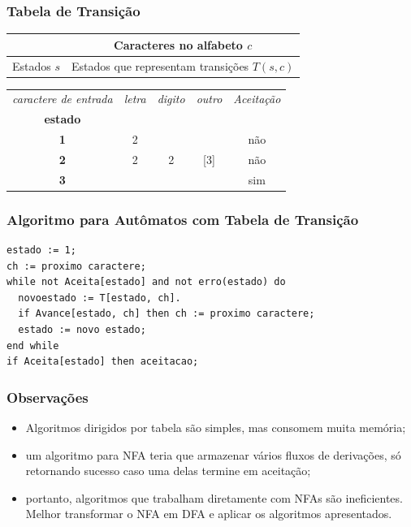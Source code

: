 \documentclass[table]{beamer}
\begin{document}
\begin{frame}
   \frametitle{Tabela de Transição}
   \centering
   \begin{table}
      \begin{tabular}{c|c}
       & Caracteres no alfabeto $c$ \\
      \hline 
      Estados $s$ & Estados que representam transições $T(s,c)$ \\
   \end{tabular}
   \end{table}

   \begin{table}
      \begin{tabular}{|c|c|c|c|c|}
      \hline
      \textit{caractere de entrada} & \textit{letra} & \textit{digito} & \textit{outro} & \textit{Aceitação} \\
      \textbf{estado} & & & &\\
      \hline
      \textbf{1} & 2 & & & não \\
      \textbf{2} & 2 & 2 & [3] & não \\
      \textbf{3} &   &   & & sim  \\
      \hline
      \end{tabular}
   \end{table}
\end{frame}

\begin{frame}[fragile]
   \frametitle{Algoritmo para Autômatos com Tabela de Transição}
   \begin{verbatim}
estado := 1;
ch := proximo caractere;
while not Aceita[estado] and not erro(estado) do
  novoestado := T[estado, ch].
  if Avance[estado, ch] then ch := proximo caractere;
  estado := novo estado;
end while
if Aceita[estado] then aceitacao;
   \end{verbatim}
\end{frame}

\begin{frame}
   \frametitle{Observações}
   \begin{itemize}
      \item Algoritmos dirigidos por tabela são simples, mas consomem muita memória;
      \item um algoritmo para NFA teria que armazenar vários fluxos de derivações, só retornando sucesso caso uma delas termine em aceitação;
      \item portanto, algoritmos que trabalham diretamente com NFAs são ineficientes. Melhor transformar o NFA em DFA e aplicar os algoritmos apresentados. 
   \end{itemize}
\end{frame}
\end{document}
